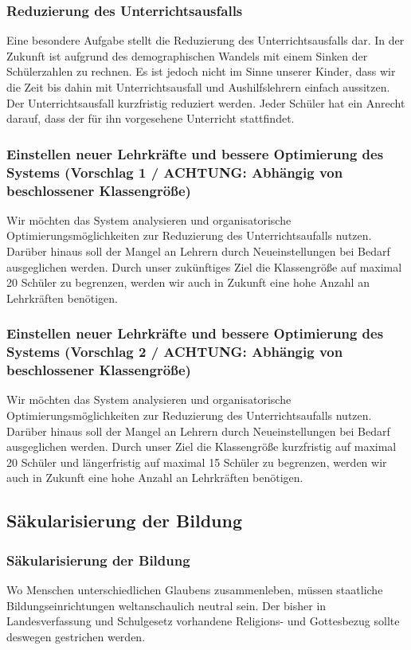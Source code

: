 \subsubsection{Reduzierung des Unterrichtsausfalls}
\abstimmung
Eine besondere Aufgabe stellt die Reduzierung des Unterrichtsausfalls dar. In der Zukunft ist aufgrund des demographischen Wandels mit einem Sinken der Schülerzahlen zu rechnen. Es ist jedoch nicht im Sinne unserer Kinder, dass wir die Zeit bis dahin mit Unterrichtsausfall und Aushilfslehrern einfach aussitzen. Der Unterrichtsausfall kurzfristig reduziert werden. Jeder Schüler hat ein Anrecht darauf, dass der für ihn vorgesehene Unterricht stattfindet.

\subsubsection{Einstellen neuer Lehrkräfte und bessere Optimierung des Systems (Vorschlag 1 / ACHTUNG: Abhängig von beschlossener Klassengröße)}
\abstimmung
Wir möchten das System analysieren und organisatorische Optimierungsmöglichkeiten zur Reduzierung des Unterrichtsaufalls nutzen. Darüber hinaus soll der Mangel an Lehrern durch Neueinstellungen bei Bedarf ausgeglichen werden. Durch unser zukünftiges Ziel die Klassengröße auf maximal 20 Schüler zu begrenzen, werden wir auch in Zukunft eine hohe Anzahl an Lehrkräften benötigen.

\subsubsection{Einstellen neuer Lehrkräfte und bessere Optimierung des Systems (Vorschlag 2 / ACHTUNG: Abhängig von beschlossener Klassengröße)}
\abstimmung
Wir möchten das System analysieren und organisatorische Optimierungsmöglichkeiten zur Reduzierung des Unterrichtsaufalls nutzen. Darüber hinaus soll der Mangel an Lehrern durch Neueinstellungen bei Bedarf ausgeglichen werden. Durch unser Ziel die Klassengröße kurzfristig auf maximal 20 Schüler und längerfristig auf maximal 15 Schüler zu begrenzen, werden wir auch in Zukunft eine hohe Anzahl an Lehrkräften benötigen.

\subsection*{Säkularisierung der Bildung}

\subsubsection{Säkularisierung der Bildung}
\abstimmung
Wo Menschen unterschiedlichen Glaubens zusammenleben, müssen staatliche Bildungseinrichtungen weltanschaulich neutral sein. Der bisher in Landesverfassung und Schulgesetz vorhandene Religions- und Gottesbezug sollte deswegen gestrichen werden.
 
